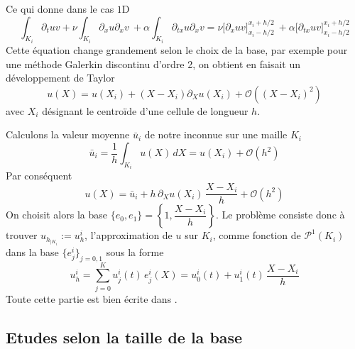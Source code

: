 Ce qui donne dans le cas $1$D
\begin{equation}\label{EDP_RS_Formulation_Faible}
    \int_{K_i} \partial_t uv + \nu \int_{K_i}\partial_{x}u\partial_{x}v \ + \alpha \int_{K_i} \partial_{tx}u\partial_{x}v
    =  \nu \Big[\partial_{x}u v \Big]^{x_i +h/2}_{x_i - h/2} \ + \alpha \Big[\partial_{tx}u v \Big]^{x_i +h/2}_{x_i - h/2} 
\end{equation}
Cette équation change grandement selon le choix de la base, par exemple pour une méthode Galerkin discontinu d'ordre 2, on obtient en faisait un développement de Taylor 
\begin{equation*}
    u(X) = u(X_i) + (X - X_i)\partial_X u(X_i) + \mathcal{O}\!\left((X - X_i)^2\right)
\end{equation*}
avec $X_i$ désignant le centroïde d'une cellule de longueur $h$.

Calculons la valeur moyenne $\bar{u}_i$ de notre inconnue sur une maille $K_i$
\begin{equation*}
\bar{u}_i = \frac{1}{h} \int_{K_i} u(X)\,dX = u(X_i) + \mathcal{O}\!\left(h^2\right)
\end{equation*}
Par conséquent
\begin{equation*}
u(X) = \bar{u}_i + h\,\partial_X u(X_i)\,\frac{X - X_i}{h} + \mathcal{O}\!\left(h^2\right)
\end{equation*}
On choisit alors la base $\{e_0, e_1\} = \left\{1, \dfrac{X - X_i}{h}\right\}$.
Le problème consiste donc à trouver $u_{h_{|K_i}} := u_h^i$, l'approximation de $u$ sur $K_i$, comme fonction de $\mathcal{P}^1(K_i)$ dans la base $\{e_j^i\}_{j=0,1}$ sous la forme 
\begin{equation}\label{base_formulation_varia_GD}
    u_h^i = \sum_{j=0}^{K} u_j^i(t)\, e_j^i(X) = u_0^i(t) + u_1^i(t)\,\frac{X - X_i}{h}
\end{equation}
Toute cette partie est bien écrite dans \cite[p.~29]{FrancoisVilar2010}.

\subsection{Etudes selon la taille de la base}
